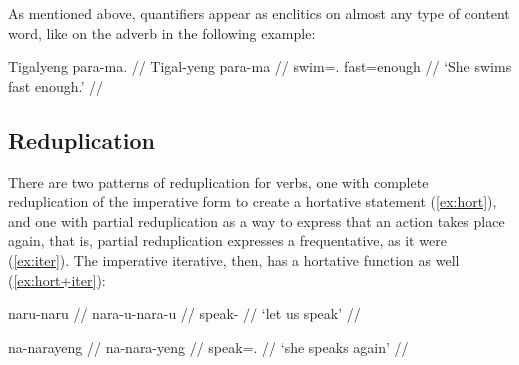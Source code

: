 As mentioned above, quantifiers appear as enclitics on almost any type of 
content word, like on the adverb  in the following example:

\ex
\begingl
	\gla Tigalyeng para-ma. //
	\glb Tigal-yeng para-ma //
	\glc swim=\TsgF{}.\Aarg{} fast=enough //
	\glft `She swims fast enough.' //
\endgl

% 
% 

\xe


\subsection{Reduplication}
\label{subsec:reduplication}

There are two patterns of reduplication for verbs, one with complete 
reduplication of the imperative form to create a hortative statement 
(\ref{ex:hort}), and one with partial reduplication as a way to express that an 
action takes place again, that is, partial reduplication expresses a 
frequentative, as it were (\ref{ex:iter}). The imperative iterative, then, has a 
hortative function as well (\ref{ex:hort+iter}):

\pex
\a\label{ex:hort}\begingl%
	\gla naru-naru //
	\glb nara-u-nara-u //
	\glc speak-\Imp{}\til\Hort{} //
	\glft `let us speak' //
\endgl

\a\label{ex:iter}\begingl
	\gla na-narayeng //
	\glb na-nara-yeng //
	\glc \Iter{}\til{}speak=\TsgF{}.\Aarg{} //
	\glft `she speaks again' //
\endgl

